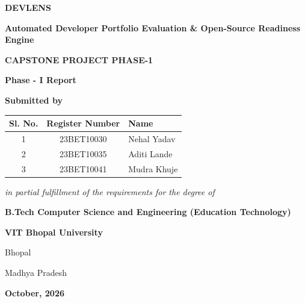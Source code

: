\documentclass[12pt,a4paper]{article}
\begin{document}
\thispagestyle{fancy}
\begin{center}
    \vspace*{0.2cm}
    {\fontsize{16pt}{18pt}\bfseries DEVLENS \par}
    \vspace{0.2cm}
    {\fontsize{13pt}{15pt}\bfseries Automated Developer Portfolio Evaluation \& Open-Source Readiness Engine \par}
    
    \vspace{1.2cm}
    {\fontsize{13pt}{15pt}\bfseries CAPSTONE PROJECT PHASE-1 \par}
    \vspace{0.2cm}
    {\fontsize{12pt}{14pt}\bfseries Phase - I Report \par}
    
    \vspace{0.8cm}
    {\fontsize{12pt}{14pt}\bfseries Submitted by \par}
    \vspace{0.3cm}
    
    \begin{table}[h!]
        \centering
        \begin{tabular}{|c|c|l|}
            \hline
            \textbf{Sl. No.} & \textbf{Register Number} & \textbf{Name} \\ \hline
            1 & 23BET10030 & Nehal Yadav \\ \hline
            2 & 23BET10035 & Aditi Lande \\ \hline
            3 & 23BET10041 & Mudra Khuje \\ \hline
        \end{tabular}
    \end{table}
    
    \vspace{0.8cm}
    {\fontsize{11pt}{13pt}\itshape in partial fulfillment of the requirements for the degree of \par}
    \vspace{0.2cm}
    {\fontsize{12pt}{14pt}\bfseries B.Tech Computer Science and Engineering (Education Technology) \par}
    
    \vfill
    
    {\fontsize{13pt}{15pt}\bfseries VIT Bhopal University \par}
    {\fontsize{12pt}{14pt} Bhopal \par}
    {\fontsize{12pt}{14pt} Madhya Pradesh \par}
    \vspace{0.3cm}
    {\fontsize{12pt}{14pt}\bfseries October, 2026 \par}
\end{center}
\end{document}

